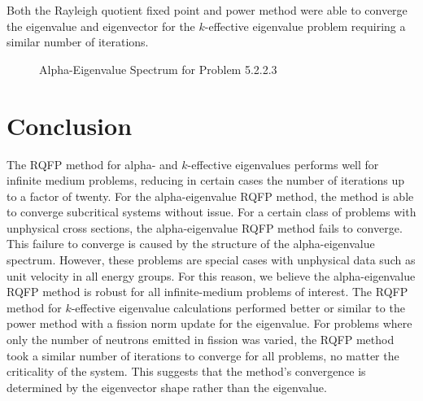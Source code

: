 Both the Rayleigh quotient fixed point and power method were able to converge the eigenvalue and eigenvector for the $k$-effective eigenvalue problem requiring a similar number of iterations. 

\begin{figure}
\centering
	\resizebox{0.75\textwidth}{!}{
	}
\caption{Alpha-Eigenvalue Spectrum for Problem 5.2.2.3}
\label{fig:G81P3Spec}
\end{figure}

\begin{table}[H]
    \centering
    \caption{Transport Sweeps for Convergence for Problem 5.2.2.3}
\label{table:G81c}
\end{table}

\label{sec:Res}

\section{Conclusion}

The RQFP method for alpha- and $k$-effective eigenvalues performs well for infinite medium problems, reducing in certain cases the number of iterations up to a factor of twenty. For the alpha-eigenvalue RQFP method, the method is able to converge subcritical systems without issue. For a certain class of problems with unphysical cross sections, the alpha-eigenvalue RQFP method fails to converge. This failure to converge is caused by the structure of the alpha-eigenvalue spectrum. However, these problems are special cases with unphysical data such as unit velocity in all energy groups. For this reason, we believe the alpha-eigenvalue RQFP method is robust for all infinite-medium problems of interest. The RQFP method for $k$-effective eigenvalue calculations performed better or similar to the power method with a fission norm update for the eigenvalue. For problems where only the number of neutrons emitted in fission was varied, the RQFP method took a similar number of iterations to converge for all problems, no matter the criticality of the system. This suggests that the method's convergence is determined by the eigenvector shape rather than the eigenvalue.

